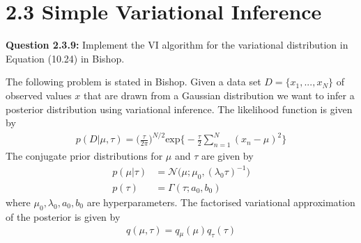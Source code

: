\section*{2.3 Simple Variational Inference}

\begin{tcolorbox}
\textbf{Question 2.3.9:}
Implement the VI algorithm for the variational distribution in Equation (10.24) in Bishop.
\end{tcolorbox}

The following problem is stated in Bishop. Given a data set $D = \{x_1,...,x_N\}$ of observed values $x$ that are drawn from a Gaussian distribution we want to infer a posterior distribution using variational inference. The likelihood function is given by
\begin{align*}
  p(D|\mu, \tau) = \bigg( \frac{\tau}{2 \pi} \bigg)^{N/2} \text{exp} \bigg\{ - \frac{\tau}{2} \sum_{n=1}^N (x_n-\mu)^2 \bigg\}
\end{align*}
The conjugate prior distributions for $\mu$ and $\tau$ are given by
\begin{align*}
  p(\mu|\tau) & = \mathcal{N} \big( \mu;\mu_0, (\lambda_0\tau)^{-1} \big) \\
  p(\tau) & = \Gamma(\tau;a_0, b_0)
\end{align*}
where $\mu_0, \lambda_0, a_0, b_0$ are hyperparameters. The factorised variational approximation of the posterior is given by
\begin{align*}
  q(\mu, \tau) = q{_\mu}(\mu)q_{\tau}(\tau)
\end{align*}

